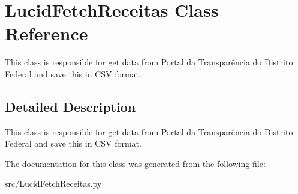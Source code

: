 \hypertarget{classLucidFetchReceitas}{
\section{LucidFetchReceitas Class Reference}
\label{classLucidFetchReceitas}
}


This class is responsible for get data from Portal da Transparência do Distrito Federal and save this in CSV format.  




\subsection{Detailed Description}
This class is responsible for get data from Portal da Transparência do Distrito Federal and save this in CSV format. 

The documentation for this class was generated from the following file:\begin{DoxyCompactItemize}
\item 
src/LucidFetchReceitas.py\end{DoxyCompactItemize}
